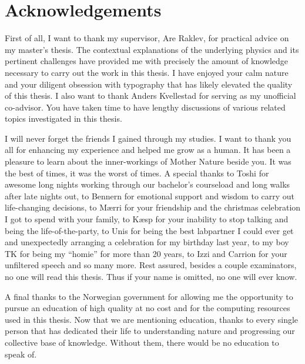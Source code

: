 \chapter*{Acknowledgements}
First of all, I want to thank my supervisor, Are Raklev, for practical advice on my master's thesis. The contextual explanations of the underlying physics and its pertinent challenges have provided me with precisely the amount of knowledge necessary to carry out the work in this thesis. I have enjoyed your calm nature and your diligent obsession with typography that has likely elevated the quality of this thesis. I also want to thank Anders Kvellestad for serving as my unofficial co-advisor. You have taken time to have lengthy discussions of various related topics investigated in this thesis.

I will never forget the friends I gained through my studies. I want to thank you all for enhancing my experience and helped me grow as a human. It has been a pleasure to learn about the inner-workings of Mother Nature beside you. It was the best of times, it was the worst of times. A special thanks to Toshi for awesome long nights working through our bachelor's courseload and long walks after late nights out, to Bennern for emotional support and wisdom to carry out life-changing decisions, to Mærri for your friendship and the christmas celebration I got to spend with your family, to Kæsp for your inability to stop talking and being the life-of-the-party, to Unis for being the best labpartner I could ever get and unexpectedly arranging a celebration for my birthday last year, to my boy TK for being my ``homie'' for more than 20 years, to Izzi and Carrion for your unfiltered speech and so many more. Rest assured, besides a couple examinators, no one will read this thesis. Thus if your name is omitted, no one will ever know.

A final thanks to the Norwegian government for allowing me the opportunity to pursue an education of high quality at no cost and for the computing resources used in this thesis. Now that we are mentioning education, thanks to every single person that has dedicated their life to understanding nature and progressing our collective base of knowledge. Without them, there would be no education to speak of. 

